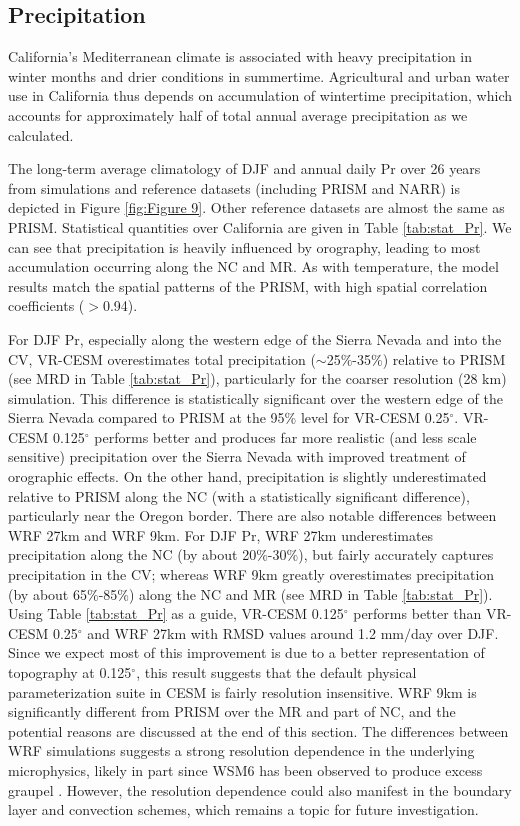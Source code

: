 \documentclass[draft,ms]{agutex}   %
\begin{document}
\begin{article}
\subsection{Precipitation}

California's Mediterranean climate is associated with heavy precipitation in winter months and drier conditions in summertime.  Agricultural and urban water use in California thus depends on accumulation of wintertime precipitation, which accounts for approximately half of total annual average precipitation as we calculated.

The long-term average climatology of DJF and annual daily Pr over 26 years from simulations and reference datasets (including PRISM and NARR) is depicted in Figure \ref{fig:Figure 9}. Other reference datasets are almost the same as PRISM. Statistical quantities over California are given in Table \ref{tab:stat_Pr}. We can see that precipitation is heavily influenced by orography, leading to most accumulation occurring along the NC and MR. As with temperature, the model results match the spatial patterns of the PRISM, with high spatial correlation coefficients ($>$0.94).

For DJF Pr, especially along the western edge of the Sierra Nevada and into the CV, VR-CESM overestimates total precipitation ($\sim$25$\%$-35$\%$) relative to PRISM (see MRD in Table \ref{tab:stat_Pr}), particularly for the coarser resolution (28 km) simulation. This difference is statistically significant over the western edge of the Sierra Nevada compared to PRISM at the 95\% level for VR-CESM 0.25$^\circ$. VR-CESM 0.125$^\circ$ performs better and produces far more realistic (and less scale sensitive) precipitation over the Sierra Nevada with improved treatment of orographic effects. On the other hand, precipitation is slightly underestimated relative to PRISM along the NC (with a statistically significant difference), particularly near the Oregon border. There are also notable differences between WRF 27km and WRF 9km. For DJF Pr, WRF 27km underestimates precipitation along the NC (by about 20$\%$-30$\%$), but fairly accurately captures precipitation in the CV; whereas WRF 9km greatly overestimates precipitation (by about 65$\%$-85$\%$) along the NC and MR (see MRD in Table \ref{tab:stat_Pr}). Using Table \ref{tab:stat_Pr} as a guide, VR-CESM 0.125$^\circ$ performs  better than VR-CESM 0.25$^\circ$ and WRF 27km with RMSD values around 1.2 mm$/$day over DJF. Since we expect most of this improvement is due to a better representation of topography at 0.125$^\circ$, this result suggests that the default physical parameterization suite in CESM is fairly resolution insensitive. WRF 9km is significantly different from PRISM over the MR and part of NC, and the potential reasons are discussed at the end of this section. The differences between WRF simulations suggests a strong resolution dependence in the underlying microphysics, likely in part since WSM6 has been observed to produce excess graupel \citep{jankov2009evaluation}. However, the resolution dependence could also manifest in the boundary layer and convection schemes, which remains a topic for future investigation.


\end{article}
\end{document}
